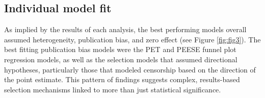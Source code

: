 \documentclass[
  man, donotrepeattitle,floatsintext]{apa7}
\begin{document}
\clearpage

\hypertarget{individual-model-fit}{%
\subsection{Individual model fit}\label{individual-model-fit}}

As implied by the results of each analysis, the best performing models overall assumed heterogeneity, publication bias, and zero effect (see Figure \ref{fig:fig3}). The best fitting publication bias models were the PET and PEESE funnel plot regression models, as well as the selection models that assumed directional hypotheses, particularly those that modeled censorship based on the direction of the point estimate. This pattern of findings suggests complex, results-based selection mechanisms linked to more than just statistical significance.

\clearpage
\end{document}
